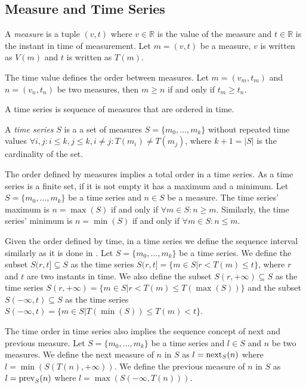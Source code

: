 \subsection{Measure and Time Series}

A \emph{measure} is a tuple $(v,t)$ where $v\in{\mathbb{R}}$ is the
value of the measure and $t \in \mathbb{R}$ is the instant in time of
measurement. Let $m = (v,t)$ be a measure, $v$ is written as $V(m)$
and $t$ is written as $T(m)$.

The time value defines the order between measures.  Let $m = (v_m,
t_m)$ and $n = (v_n, t_n)$ be two measures, then $m\geq n$ if and only
if $t_m\geq t_n$.


A time series is sequence of measures that are ordered in time. 
\begin{definition}
  A \emph{time series} $S$ is a a set of measures $S = \{m_0, \ldots,
  m_k\}$ without repeated time values $\forall i,j: i\leq k, j\leq k,
  i\neq j : T(m_i)\neq T(m_j)$, where $k+1=|S|$ is the cardinality of
  the set.
\end{definition}

The order defined by measures implies a total order in a time
series. As a time series is a finite set, if it is not empty it has a
maximum and a minimum.  Let $S=\{m_0,\ldots,m_k\}$ be a time series
and $n\in S$ be a measure. The time series' maximum is $n=\max(S)$ if
and only if $\forall m \in S: n \geq m $.  Similarly, the time series'
minimum is $n=\min(S)$ if and only if $\forall m \in S: n \leq m$.

Given the order defined by time, in a time series we define the
sequence interval similarly as it is done in
\cite{last:keogh,last:hetland}.  Let $S=\{m_0, \ldots, m_k\}$ be a
time series. We define the subset $S(r,t] \subseteq S$ as the time
series $S(r,t]=\{m\in S | r<T(m)\leq t\}$, where $r$ and $t$ are two
instants in time.  We also define the subset $S(r,+\infty)\subseteq S$
as the time series $S(r,+\infty) = \{m\in S | r< T(m) \leq
T(\max(S))\}$ and the subset $S(-\infty,t)\subseteq S$ as the time
series $S(-\infty,t) = \{m\in S | T(\min(S))\leq T(m) < t\}$.


The time order in time series also implies the sequence concept of
next and previous measure.  Let $S=\{m_0, \ldots, m_k\}$ be a time
series and $l\in S$ and $n$ be two measures. We define the next
measure of $n$ in $S$ as $l=\operatorname*{next}_S(n)$ where $l =
\min(S(T(n),+\infty))$. We define the previous measure of $n$ in $S$
as $l=\operatorname*{prev}_S(n)$ where $l = \max(S(-\infty,T(n)))$.


